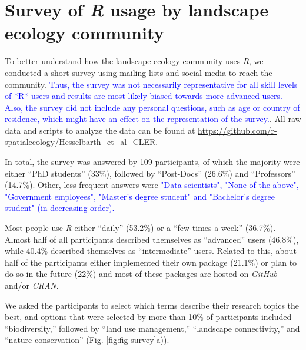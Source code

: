 \documentclass[smallextended]{svjour3}       %
\begin{document}
\begin{table}
\begin{tabularx}{1.35\linewidth}{lrXr}
\end{tabularx}

\label{tab:packages}

\end{table}

\FloatBarrier

\hypertarget{survey-of-r-usage-by-landscape-ecology-community}{%
\section{\texorpdfstring{Survey of \emph{R} usage by landscape ecology community}{Survey of R usage by landscape ecology community}}\label{survey-of-r-usage-by-landscape-ecology-community}}

To better understand how the landscape ecology community uses \emph{R}, we conducted a short survey using mailing lists and social media to reach the community. \textcolor{blue}{Thus, the survey was not necessarily representative for all skill levels of *R* users and results are most likely biased towards more advanced users. Also, the survey did not include any personal questions, such as age or country of residence, which might have an effect on the representation of the survey.}.
All raw data and scripts to analyze the data can be found at \url{https://github.com/r-spatialecology/Hesselbarth_et_al_CLER}.

In total, the survey was answered by 109 participants, of which the majority were either ``PhD students'' (33\%), followed by ``Post-Docs'' (26.6\%) and ``Professors'' (14.7\%).
Other, less frequent answers were \textcolor{blue}{"Data scientists", "None of the above", "Government employees", "Master's degree student" and "Bachelor's degree student" (in decreasing order).}

Most people use \emph{R} either ``daily'' (53.2\%) or a ``few times a week'' (36.7\%).
Almost half of all participants described themselves as ``advanced'' users (46.8\%), while 40.4\% described themselves as ``intermediate'' users.
Related to this, about half of the participants either implemented their own package (21.1\%) or plan to do so in the future (22\%) and most of these packages are hosted on \emph{GitHub} and/or \emph{CRAN}.

We asked the participants to select which terms describe their research topics the best, and options that were selected by more than 10\% of participants included ``biodiversity,'' followed by ``land use management,'' ``landscape connectivity,'' and ``nature conservation'' (Fig. \ref{fig:fig-survey}a)).
\end{document}
